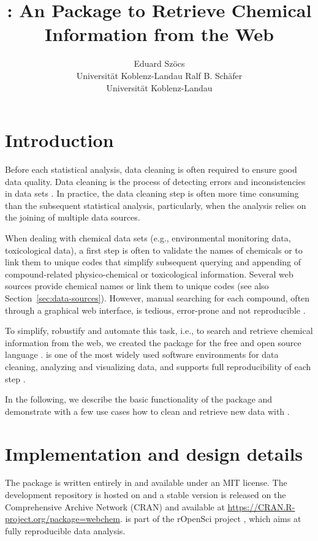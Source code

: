 \documentclass[article]{jss}
\author{Eduard Sz\"ocs\\Universit\"at Koblenz-Landau \And 
        Ralf B. Sch\"afer\\Universit\"at Koblenz-Landau}
\title{\pkg{webchem}: An \proglang{R} Package to Retrieve Chemical Information from the Web}
\begin{document}
\section[Introduction]{Introduction}
Before each statistical analysis, data cleaning is often required to
ensure good data quality.  Data cleaning is the process of detecting
errors and inconsistencies in data sets \citep{Chapman_2005}.  In
practice, the data cleaning step is often more time consuming than the
subsequent statistical analysis, particularly, when the analysis
relies on the joining of multiple data sources.

When dealing with chemical data sets (e.g., environmental monitoring
data, toxicological data), a first step is often to validate the names
of chemicals or to link them to unique codes that simplify subsequent
querying and appending of compound-related physico-chemical or
toxicological information.  Several web sources provide chemical names
or link them to unique codes (see also
Section~\ref{sec:data-sources}).  However, manual searching for each
compound, often through a graphical web interface, is tedious,
error-prone and not reproducible \citep{Peng_2009}.

To simplify, robustify and automate this task, i.e., to search and
retrieve chemical information from the web, we created the
 package \citep{cran} for the free and open source
 language \citep{r_2015, Wehrens_2011}.   is
one of the most widely used software environments for data cleaning,
analyzing and visualizing data, and supports full reproducibility of
each step \citep{Marwick_2016}.

In the following, we describe the basic functionality of the package
and demonstrate with a few use cases how to clean and retrieve new
data with .


\section[Implementation and design details]{Implementation and design details}
The  package is written entirely in  and
available under an MIT license.  The development repository is hosted
on \citet{github} and a stable version is released on the
Comprehensive  Archive Network (CRAN) and available at
\url{https://CRAN.R-project.org/package=webchem}.   is
part of the rOpenSci project \citep{boettiger2015building}, which aims
at fully reproducible data analysis.
\end{document}
